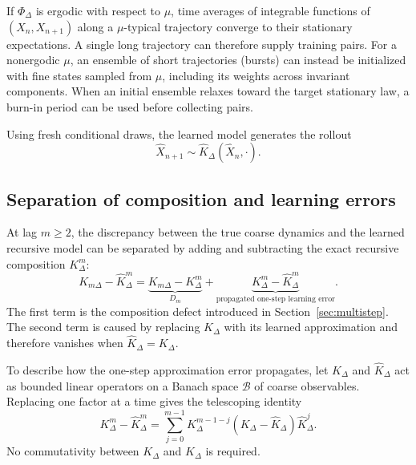 \documentclass[final,hidelinks]{siamart251216}
\begin{document}
\begin{remark}
If $\Phi_\Delta$ is ergodic with respect to $\mu$, time averages of
integrable functions of $(X_n,X_{n+1})$ along a $\mu$-typical trajectory
converge to their stationary expectations. A single long trajectory can
therefore supply training pairs. For a nonergodic $\mu$, an ensemble of
short trajectories (bursts) can instead be initialized with fine states
sampled from $\mu$, including its weights across invariant components.
When an initial ensemble relaxes toward the target stationary law, a
burn-in period can be used before collecting pairs.
\end{remark}

Using fresh conditional draws, the learned model generates the rollout
\begin{equation}
    \widehat X_{n+1}\sim\widehat K_\Delta(\widehat X_n,\cdot).
    \label{eq:learned_recursive}
\end{equation}

\subsection{Separation of composition and learning errors}

At lag $m\ge2$, the discrepancy
between the true coarse dynamics and the learned recursive model can be
separated by adding and subtracting the exact recursive composition
$K_\Delta^m$:
\begin{equation}
\boxed{
    K_{m\Delta}-\widehat K_\Delta^m
    =
    \underbrace{K_{m\Delta}-K_\Delta^m}_{D_m}
    +
    \underbrace{K_\Delta^m-\widehat K_\Delta^m}_{
        \text{propagated one-step learning error}
    }.
}
    \label{eq:error_decomp}
\end{equation}
The first term is the composition defect introduced in
Section~\ref{sec:multistep}. The second term is caused by replacing
$K_\Delta$ with its learned approximation and therefore vanishes when
$\widehat K_\Delta=K_\Delta$.

To describe how the one-step approximation error propagates, let
$K_\Delta$ and $\widehat K_\Delta$ act as bounded linear operators on a
Banach space $\mathcal B$ of coarse observables. Replacing one factor at a
time gives the telescoping identity
\begin{equation}
    K_\Delta^m-\widehat K_\Delta^m
    =
    \sum_{j=0}^{m-1}
    K_\Delta^{m-1-j}
    (K_\Delta-\widehat K_\Delta)
    \widehat K_\Delta^j .
    \label{eq:telescoping}
\end{equation}
No commutativity between $K_\Delta$ and $\widehat K_\Delta$ is required.
\end{document}

